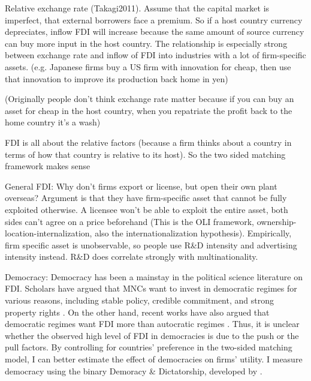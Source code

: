 
Relative exchange rate (Takagi2011). Assume that the capital market is
imperfect, that external borrowers face a premium. So if a host country currency
depreciates, inflow FDI will increase because the same amount of source currency
can buy more input in the host country. The relationship is especially strong
between exchange rate and inflow of FDI into industries with a lot of
firm-specific assets. (e.g. Japanese firms buy a US firm with innovation for
cheap, then use that innovation to improve its production back home in yen)

(Originally people don't think exchange rate matter because if you can buy an
asset for cheap in the host country, when you repatriate the profit back to the
home country it's a wash)

FDI is all about the relative factors (because a firm thinks about a country in
terms of how that country is relative to its host). So the two sided matching
framework makes sense

General FDI: Why don't firms export or license, but open their own plant
overseas? Argument is that they have firm-specific asset that cannot be fully
exploited otherwise. A licensee won't be able to exploit the entire asset, both
sides can't agree on a price beforehand (This is the OLI framework,
ownership-location-internalization, also the internationalization hypothesis).
Empirically, firm specific asset is unobservable, so people use R\&D intensity
and advertising intensity instead. R\&D does correlate strongly with
multinationality.

\item Democracy: Democracy has been a mainstay in the political science
  literature on FDI. Scholars have argued that MNCs want to invest in democratic
  regimes for various reasons, including stable policy, credible commitment, and
  strong property rights \citep{Ahlquist2006, Li2003, Jensen2003}. On the other
  hand, recent works have also argued that democratic regimes want FDI more than
  autocratic regimes \citep{Pandya2016}. Thus, it is unclear whether the
  observed high level of FDI in democracies is due to the push or the pull
  factors. By controlling for countries' preference in the two-sided matching
  model, I can better estimate the effect of democracies on firms' utility. I
  measure democracy using the binary Demoracy \& Dictatorship, developed by
  \citet{Cheibub2009b}.